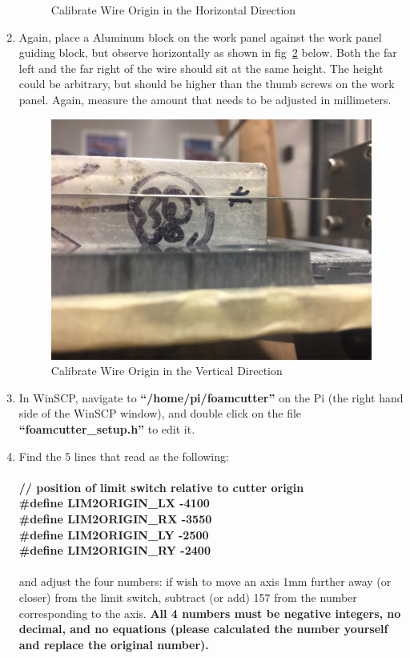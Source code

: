 \documentclass[titlepage,12pt,letter]{report}
\numberwithin{equation}{chapter}
\begin{document}
\begin{enumerate}[itemsep = 5pt,topsep=0pt]
\begin{figure} [H]
	\caption{Calibrate Wire Origin in the Horizontal Direction}
	\label{fig:zero1}
\end{figure}
\item Again, place a Aluminum block on the work panel against the work panel guiding block, but observe horizontally as shown in fig~\ref{fig:zero2} below. Both the far left and the far right of the wire should sit at the same height. The height could be arbitrary, but should be higher than the thumb screws on the work panel. Again, measure the amount that needs to be adjusted in millimeters.
\begin{figure} [H]
	\includegraphics[width = 0.8\linewidth]{./Figures/zero_wire_2.jpg}
	\caption{Calibrate Wire Origin in the Vertical Direction}
	\label{fig:zero2}
\end{figure}
\item In WinSCP, navigate to \textbf{``/home/pi/foamcutter''} on the Pi (the right hand side of the WinSCP window), and double click on the file \textbf{``foamcutter\_setup.h''} to edit it. 
\item Find the 5 lines that read as the following:\\ \\
\textbf{// position of limit switch relative to cutter origin}\\
\textbf{\#define LIM2ORIGIN\_LX -4100}\\
\textbf{\#define LIM2ORIGIN\_RX -3550}\\
\textbf{\#define LIM2ORIGIN\_LY -2500}\\
\textbf{\#define LIM2ORIGIN\_RY -2400}\\ \\
and adjust the four numbers: if wish to move an axis 1mm further away (or closer) from the limit switch, subtract (or add) 157 from the number corresponding to the axis. \textbf{All 4 numbers must be negative integers, no decimal, and no equations (please calculated the number yourself and replace the original number).}

\end{enumerate}
\end{document}
